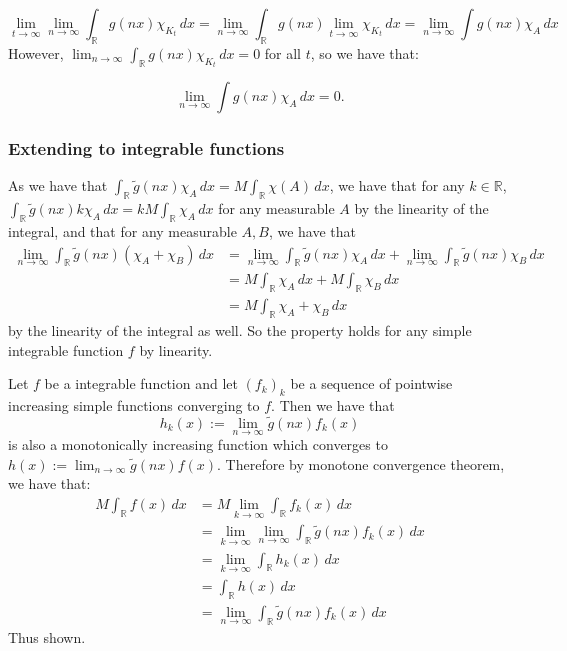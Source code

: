 \documentclass{article}
\theoremstyle{definition}
\numberwithin{theorem}{section}
\numberwithin{equation}{section}
\begin{document}
\begin{equation}
	\lim_{t \rightarrow \infty} \lim_{n \rightarrow \infty} \int_{\mathbb{R}} g(nx) \chi_{K_t} \, dx = \lim_{n \rightarrow \infty}  \int_{\mathbb{R}} g(nx) \lim_{t \rightarrow \infty}\chi_{K_t} \, dx = \lim_{n \rightarrow \infty} \int g(nx) \chi_{A} \, dx
\end{equation}
However, $\lim_{n \rightarrow \infty} \int_{\mathbb{R}} g(nx) \chi_{K_t} \, dx = 0$ for all $t$, so we have that:

\begin{equation}
	\lim_{n \rightarrow \infty} \int g(nx) \chi_{A} \, dx = 0.
\end{equation}

\subsubsection{Extending to integrable functions}
As we have that $\int_{\mathbb{R}} \tilde{g}(nx) \chi_A \, dx = M \int_{\mathbb{R}} \chi(A) \, dx$, we have that for any $k \in \mathbb{R}$, $\int_{\mathbb{R}}\tilde{g}(nx) k \chi_A \, dx = k M \int_{\mathbb{R}} \chi_A  \, dx $ for any measurable $A$ by the linearity of the integral, and that for any measurable $A, B$, we have that
\begin{align*}
	\lim_{n \rightarrow \infty} \int_{\mathbb{R}} \tilde{g}(nx) (\chi_A + \chi_B) \, dx &= \lim_{n \rightarrow \infty} \int_{\mathbb{R}} \tilde{g}(nx) \chi_A \, dx + \lim_{n \rightarrow \infty} \int_{\mathbb{R}} \tilde{g}(nx) \chi_B \, dx\\
	&= M \int_{\mathbb{R}} \chi_A \, dx + M \int_{\mathbb{R}} \chi_B \, dx\\
	&= M \int_{\mathbb{R}} \chi_A + \chi_B \, dx 
\end{align*}
 by the linearity of the integral as well. So the property holds for any simple integrable function $f$ by linearity.

Let $f$ be a integrable function and let $\left(  f_k \right)_k$ be a sequence of pointwise increasing simple functions converging to $f$. Then we have that
\begin{equation}
	h_k(x) := \lim_{n \rightarrow \infty} \tilde{g}(nx)f_k(x)
\end{equation}
is also a monotonically increasing function which converges to $h(x) := \lim_{n \rightarrow \infty} \tilde{g}(nx) f(x)$. Therefore by monotone convergence theorem, we have that:
\begin{align*}
	M \int_{\mathbb{R}} f(x) \, dx
	&= M \lim_{k \rightarrow \infty} \int_{\mathbb{R}} f_k(x) \, dx\\
	&= \lim_{k \rightarrow \infty} \lim_{n \rightarrow \infty} \int_{\mathbb{R}}  \tilde{g}(nx)f_k(x)\, dx\\
	&= \lim_{k \rightarrow \infty} \int_{\mathbb{R}}  h_k(x) \, dx\\
	&= \int_{\mathbb{R}} h(x) \, dx\\
	&= \lim_{n \rightarrow \infty} \int_{\mathbb{R}} \tilde{g}(nx)f_k(x) \, dx
\end{align*}
Thus shown.
\end{document}
